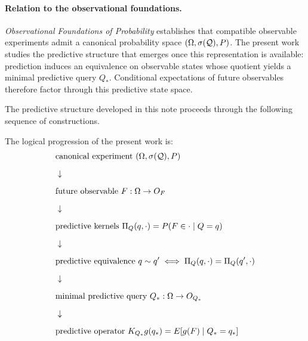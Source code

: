 
\maketitle

\begin{abstract}
Building on the canonical probability space representation established
in \emph{Observational Foundations of Probability}, this work studies
the predictive structure that emerges from compatible observable
experiments.

Given a future observable $F:\Omega\to O_F$, prediction induces an
equivalence relation on observable states determined by equality of
conditional laws.  The resulting quotient defines a minimal predictive
query $Q_*$ whose states correspond exactly to distinct predictive
laws of $F$.  A canonical positive linear operator
\[
(K_{Q_*}g)(q_*) = E[g(F)\mid Q_*=q_*]
\]
then acts on functions of this predictive state space, providing an
observable representation of prediction expressed entirely in terms of
conditional laws.  The minimal predictive query is universal: any
other predictive statistic factors through $Q_*$ via the
Doob--Dynkin lemma, making $Q_*$ the coarsest observable
representation retaining the full predictive law of $F$.
\end{abstract}

\paragraph{Relation to the observational foundations.}
\emph{Observational Foundations of Probability} establishes that
compatible observable experiments admit a canonical probability space
$(\Omega,\sigma(\mathcal{Q}),P)$.  The present work studies the predictive
structure that emerges once this representation is available:
prediction induces an equivalence on observable states whose quotient
yields a minimal predictive query $Q_*$.  Conditional expectations of
future observables therefore factor through this predictive state
space.

The predictive structure developed in this note proceeds through the
following sequence of constructions.

The logical progression of the present work is:
\[
\begin{aligned}
&\text{canonical experiment } (\Omega,\sigma(\mathcal{Q}),P)\\[6pt]
&\downarrow\\[6pt]
&\text{future observable } F:\Omega\to O_F\\[6pt]
&\downarrow\\[6pt]
&\text{predictive kernels } \Pi_Q(q,\cdot)=P(F\in\cdot\mid Q=q)\\[6pt]
&\downarrow\\[6pt]
&\text{predictive equivalence } q\sim q' \iff \Pi_Q(q,\cdot)=\Pi_Q(q',\cdot)\\[6pt]
&\downarrow\\[6pt]
&\text{minimal predictive query } Q_*:\Omega\to O_{Q_*}\\[6pt]
&\downarrow\\[6pt]
&\text{predictive operator } K_{Q_*}g(q_*)=E[g(F)\mid Q_*=q_*]
\end{aligned}
\]

